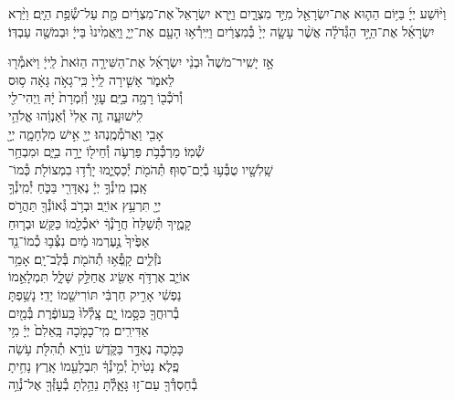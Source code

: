 \documentclass[twoside, openany, parskip=half, 11pt]{book}
\begin{document}
וַיּ֨וֹשַׁע
יְיָ֜ בַּיּ֥וֹם הַה֛וּא אֶת־יִשְׂרָאֵ֖ל מִיַּ֣ד מִצְרָ֑יִם וַיַּ֤רְא יִשְׂרָאֵל֙ אֶת־מִצְרַ֔יִם מֵ֖ת עַל־שְׂ֯פַ֥ת הַיָּֽם׃
וַיַּ֨רְא יִשְׂרָאֵ֜ל אֶת־הַיָּ֣ד הַגְּ֯דֹלָ֗ה אֲשֶׁ֨ר עָשָׂ֤ה יְיָ֙ בְּ֯מִצְרַ֔יִם וַיִּֽירְ֯א֥וּ הָעָ֖ם אֶת־יְיָ֑ וַיַּֽאֲמִ֙ינוּ֙ בַּייָ֔ וּבְמֹשֶׁ֖ה עַבְדּֽוֹ׃


אָ֣ז \hfill
יָשִֽׁיר־מֹשֶׁה֩ \hfill וּבְנֵ֨י \hfill יִשְׂרָאֵ֜ל \hfill אֶת־הַשִּׁירָ֤ה \hfill הַזֹּאת֙ \hfill לַֽייָ֔ \hfill וַיֹּאמְ֯ר֖וּ \\
לֵאמֹ֑ר \hfill אָשִׁ֤ירָה לַֽייָ֙ כִּֽי־גָאֹ֣ה גָּאָ֔ה \hfill ס֥וּס \\
וְ֯רֹכְ֯ב֖וֹ רָמָ֥ה בַיָּֽם׃ \hfill עׇזִּ֤י וְ֯זִמְרָת֙ יָ֔הּ וַֽיְהִי־לִ֖י \\
לִֽישׁוּעָ֑ה \hfill זֶ֤ה אֵלִי֙ וְ֯אַנְוֵ֔הוּ \hfill אֱלֹהֵ֥י \\
אָבִ֖י וַאֲרֹמְ֯מֶֽנְהוּ׃ \hfill יְיָ֖ אִ֣ישׁ מִלְחָמָ֑ה יְיָ֖ \\
שְׁ֯מֽוֹ׃ \hfill מַרְכְּ֯בֹ֥ת פַּרְעֹ֛ה וְ֯חֵיל֖וֹ יָרָ֣ה בַיָּ֑ם \hfill וּמִבְחַ֥ר\\
שָֽׁלִשָׁ֖יו טֻבְּ֯ע֥וּ בְ֯יַם־סֽוּף׃ \hfill תְּ֯הֹמֹ֖ת יְ֯כַסְיֻ֑מוּ יָרְ֯ד֥וּ בִמְצוֹלֹ֖ת כְּ֯מוֹ־\\
אָֽבֶן׃ \hfill מִֽינְ֯ךָ֣ יְיָ֔ נֶאְדָּרִ֖י בַּכֹּ֑חַ \hfill יְ֯מִֽינְ֯ךָ֥ \\
יְיָ֖ תִּרְעַ֥ץ אוֹיֵֽב׃ \hfill וּבְרֹ֥ב גְּ֯אוֹנְ֯ךָ֖ תַּהֲרֹ֣ס \\
קָמֶ֑יךָ \hfill תְּ֯שַׁלַּח֙ חֲרֹ֣נְ֯ךָ֔ יֹאכְ֯לֵ֖מוֹ כַּקַּֽשׁ׃ \hfill וּבְר֤וּחַ \\
אַפֶּ֙יךָ֙ נֶ֣עֶרְמוּ מַ֔יִם \hfill נִצְּ֯ב֥וּ כְ֯מוֹ־נֵ֖ד \\
נֹזְ֯לִ֑ים \hfill קָֽפְ֯א֥וּ תְ֯הֹמֹ֖ת בְּ֯לֶב־יָֽם׃ \hfill אָמַ֥ר \\
אוֹיֵ֛ב אֶרְדֹּ֥ף אַשִּׂ֖יג \hfill אֲחַלֵּ֣ק שָׁלָ֑ל תִּמְלָאֵ֣מוֹ \\
נַפְשִׁ֔י \hfill אָרִ֣יק חַרְבִּ֔י תּוֹרִישֵׁ֖מוֹ יָדִֽי׃ \hfill נָשַׁ֥פְתָּ \\
בְ֯רוּחֲךָ֖ כִּסָּ֣מוֹ יָ֑ם \hfill צָֽלְ֯לוּ֙ כַּֽעוֹפֶ֔רֶת בְּ֯מַ֖יִם \\
אַדִּירִֽים׃ \hfill מִֽי־כָמֹ֤כָה בָּֽאֵלִם֙ יְיָ֔ \hfill מִ֥י \\
כָּמֹ֖כָה נֶאְדָּ֣ר בַּקֹּ֑דֶשׁ \hfill נוֹרָ֥א תְ֯הִלֹּ֖ת עֹ֥שֵׂה \\
פֶֽלֶא׃ \hfill נָטִ֙יתָ֙ יְ֯מִ֣ינְ֯ךָ֔ תִּבְלָעֵ֖מוֹ אָֽרֶץ׃ \hfill נָחִ֥יתָ \\
בְ֯חַסְדְּ֯ךָ֖ עַם־ז֣וּ גָּאָ֑לְ֯תָּ \hfill נֵהַ֥לְתָּ בְ֯עׇזְּ֯ךָ֖ אֶל־נְ֯וֵ֥ה \\
\end{document}
